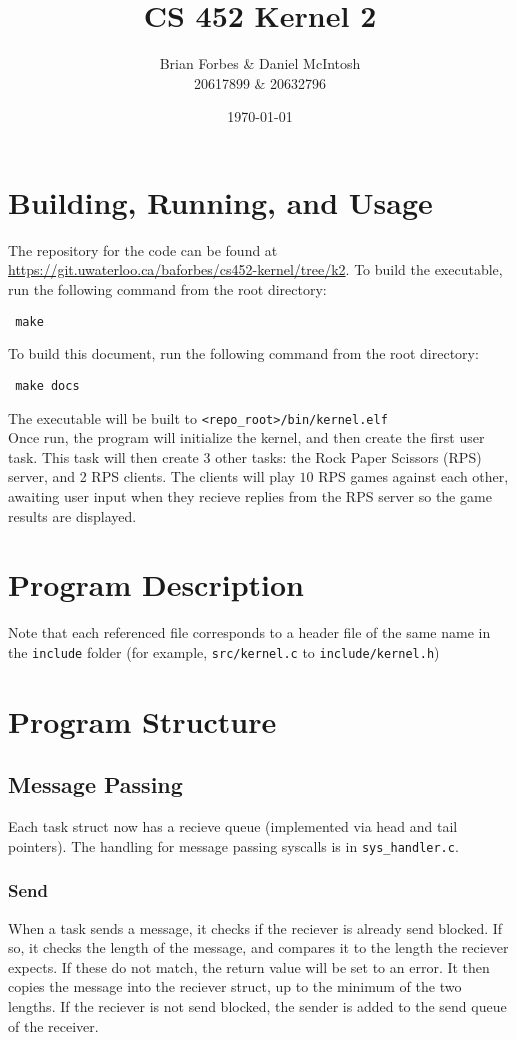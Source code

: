 \documentclass{article}
\begin{document}
\title{CS 452 Kernel 2}
\author{Brian Forbes \& Daniel McIntosh \\ 20617899 \& 20632796}
\date{\today}

\maketitle

\section{Building, Running, and Usage}

The repository for the code can be found at \url{https://git.uwaterloo.ca/baforbes/cs452-kernel/tree/k2}.
To build the executable, run the following command from the root directory: \begin{verbatim} make \end{verbatim}
To build this document, run the following command from the root directory: \begin{verbatim} make docs \end{verbatim}
The executable will be built to \verb|<repo_root>/bin/kernel.elf|\\

Once run, the program will initialize the kernel, and then create the first user task. This task will then create 3 other tasks: the Rock Paper Scissors (RPS) server, and 2 RPS clients. The clients will play $10$ RPS games against each other, awaiting user input when they recieve replies from the RPS server so the game results are displayed.

\section{Program Description}
Note that each referenced file corresponds to a header file of the same name in the \verb|include| folder (for example, \verb|src/kernel.c| to \verb|include/kernel.h|)

\section{Program Structure}
\subsection{Message Passing}
Each task struct now has a recieve queue (implemented via head and tail pointers). The handling for message passing syscalls is in \verb|sys_handler.c|.
\subsubsection{Send}
    When a task sends a message, it checks if the reciever is already send blocked. If so, it checks the length of the message, and compares it to the length the reciever expects. If these do not match, the return value will be set to an error. It then copies the message into the reciever struct, up to the minimum of the two lengths.
    If the reciever is not send blocked, the sender is added to the send queue of the receiver.
\end{document}
